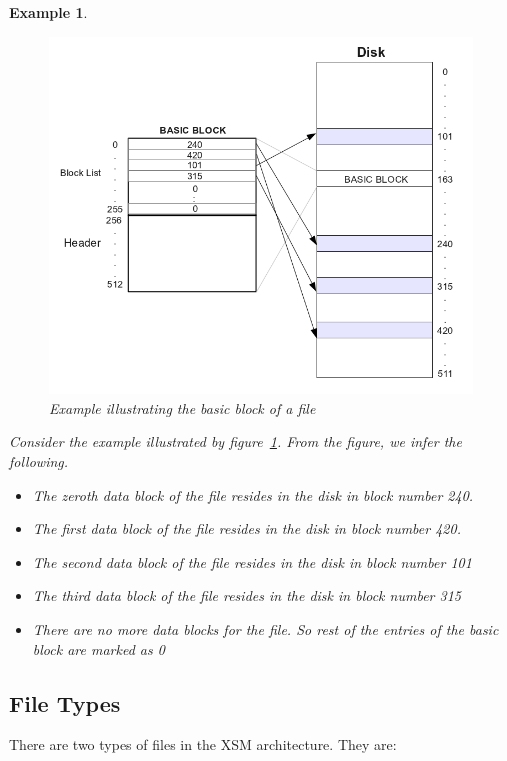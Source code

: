 \documentclass[11pt]{article}
\newtheorem{example}{Example}[section]
\begin{document}
\begin{example}
	\begin{figure}[h!]
	\centering
	\includegraphics[scale=0.50]{basic_block_example.png}
	\caption{Example illustrating the basic block of a file}
	\label{basic block example}
	\end{figure}

	Consider the example illustrated by figure~\ref{basic block example}.
	From the figure, we infer the following. 
	\begin{itemize}
		\item  The zeroth data block of the file resides in the disk in block number 240. 
		\item  The first data block of the file resides in the disk in block number 420.
		\item  The second data block of the file resides in the disk in block number 101 
		\item  The third data block of the file resides in the disk in block number 315
		\item  There are no more data blocks for the file. So rest of the entries of the basic block are marked as 0
	\end{itemize}
\end{example}

\subsection{File Types} 
There are two types of files in the XSM architecture. They are:
\end{document}
